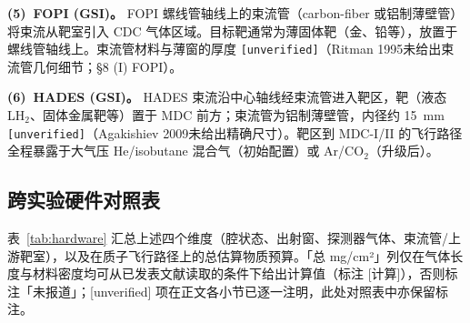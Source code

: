 \documentclass[a4paper, 11pt]{article}
\begin{document}
\textbf{(5)~FOPI (GSI)。}
FOPI 螺线管轴线上的束流管（carbon-fiber 或铝制薄壁管）将束流从靶室引入 CDC 气体区域。目标靶通常为薄固体靶（金、铅等），放置于螺线管轴线上。束流管材料与薄窗的厚度 \texttt{[unverified]}（Ritman 1995未给出束流管几何细节；§8 (I) FOPI）。

\textbf{(6)~HADES (GSI)。}
HADES 束流沿中心轴线经束流管进入靶区，靶（液态 LH$_2$、固体金属靶等）置于 MDC 前方；束流管为铝制薄壁管，内径约 15~mm \texttt{[unverified]}（Agakishiev 2009未给出精确尺寸）。靶区到 MDC-I/II 的飞行路径全程暴露于大气压 He/isobutane 混合气（初始配置）或 Ar/CO$_2$（升级后）。

\subsection{跨实验硬件对照表}
\label{sec:hardwaretable}

表~\ref{tab:hardware} 汇总上述四个维度（腔状态、出射窗、探测器气体、束流管/上游靶室），以及在质子飞行路径上的总估算物质预算。「总 mg/cm²」列仅在气体长度与材料密度均可从已发表文献读取的条件下给出计算值（标注 [计算]），否则标注「未报道」；[unverified] 项在正文各小节已逐一注明，此处对照表中亦保留标注。
\end{document}
